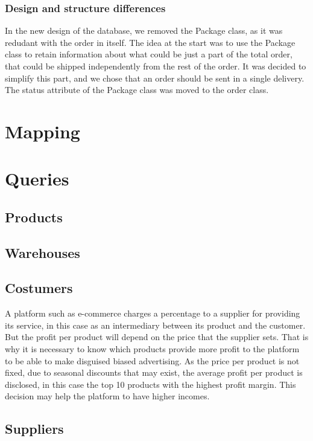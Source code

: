 \documentclass{article}
\begin{document}
\subsubsection{Design and structure differences}
In the new design of the database, we removed the Package class, as it was redudant with the order in itself. The idea at the start was to use the Package class to retain information about what could be just a part of the total order, that could be shipped independently from the rest of the order. It was decided to simplify this part, and we chose that an order should be sent in a single delivery. The status attribute of the Package class was moved to the order class.

\section{Mapping}


\section{Queries}


\subsection{Products}




\subsection{Warehouses}



\subsection{Costumers}
A platform such as e-commerce charges a percentage to a supplier for providing its service, in this case as an intermediary between its product and the customer. But the profit per product will depend on the price that the supplier sets. That is why it is necessary to know which products provide more profit to the platform to be able to make disguised biased advertising. As the price per product is not fixed, due to seasonal discounts that may exist, the average profit per product is disclosed, in this case the top 10 products with the highest profit margin. This decision may help the platform to have higher incomes.


\subsection{Suppliers}
\end{document}

